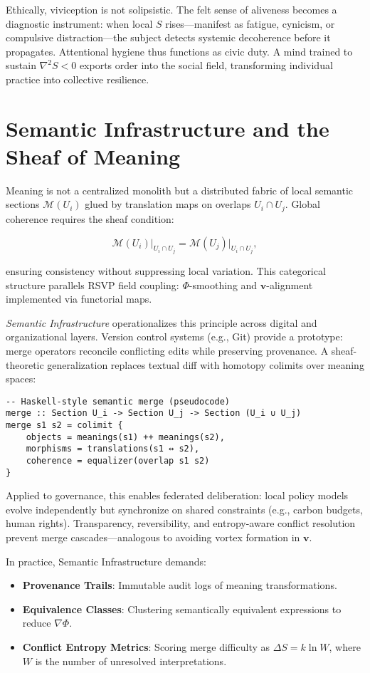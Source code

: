 \documentclass[12pt,a4paper]{article}
\begin{document}
Ethically, viviception is not solipsistic. The felt sense of aliveness becomes a diagnostic instrument: when local $S$ rises—manifest as fatigue, cynicism, or compulsive distraction—the subject detects systemic decoherence before it propagates. Attentional hygiene thus functions as civic duty. A mind trained to sustain $\nabla^2 S < 0$ exports order into the social field, transforming individual practice into collective resilience.

\section{Semantic Infrastructure and the Sheaf of Meaning}

Meaning is not a centralized monolith but a distributed fabric of local semantic sections $\mathcal{M}(U_i)$ glued by translation maps on overlaps $U_i \cap U_j$. Global coherence requires the sheaf condition:

\begin{equation}
\mathcal{M}(U_i)\big|_{U_i\cap U_j} = \mathcal{M}(U_j)\big|_{U_i\cap U_j},
\end{equation}

ensuring consistency without suppressing local variation. This categorical structure parallels RSVP field coupling: $\Phi$-smoothing and $\bm{v}$-alignment implemented via functorial maps.

\emph{Semantic Infrastructure} operationalizes this principle across digital and organizational layers. Version control systems (e.g., Git) provide a prototype: merge operators reconcile conflicting edits while preserving provenance. A sheaf-theoretic generalization replaces textual diff with homotopy colimits over meaning spaces:

\begin{verbatim}
-- Haskell-style semantic merge (pseudocode)
merge :: Section U_i -> Section U_j -> Section (U_i ∪ U_j)
merge s1 s2 = colimit { 
    objects = meanings(s1) ++ meanings(s2),
    morphisms = translations(s1 ↔ s2),
    coherence = equalizer(overlap s1 s2)
}
\end{verbatim}

Applied to governance, this enables federated deliberation: local policy models evolve independently but synchronize on shared constraints (e.g., carbon budgets, human rights). Transparency, reversibility, and entropy-aware conflict resolution prevent merge cascades—analogous to avoiding vortex formation in $\bm{v}$.

In practice, Semantic Infrastructure demands:
\begin{itemize}
\item \textbf{Provenance Trails}: Immutable audit logs of meaning transformations.
\item \textbf{Equivalence Classes}: Clustering semantically equivalent expressions to reduce $\nabla \Phi$.
\item \textbf{Conflict Entropy Metrics}: Scoring merge difficulty as $\Delta S = k \ln W$, where $W$ is the number of unresolved interpretations.
\end{itemize}
\end{document}
